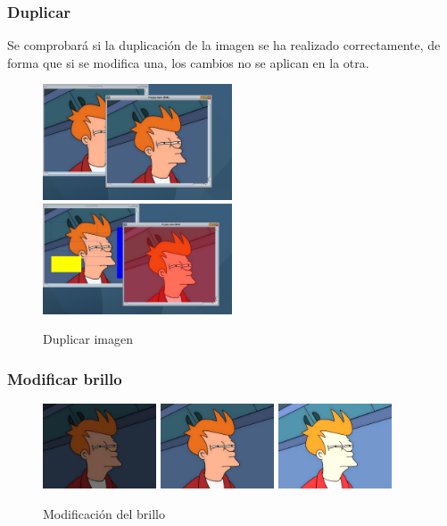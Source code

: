 \subsubsection{Duplicar}
Se comprobará si la duplicación de la imagen se ha realizado correctamente, de forma que si se modifica una, los cambios no se aplican en la otra.
\vskip0.3cm
\begin{figure}[H]
 \centering
  \includegraphics[width=0.5\textwidth]{imagenes/duplicar1.png}
  \includegraphics[width=0.5\textwidth]{imagenes/duplicar2.jpg}
 \caption{Duplicar imagen}
 \label{diseño}
 \end{figure}
\subsubsection{Modificar brillo}
\vskip0.3cm
\begin{figure}[H]
 \centering
  \includegraphics[width=0.3\textwidth]{imagenes/fryBrilo2.jpg}
  \includegraphics[width=0.3\textwidth]{imagenes/Fry.jpg}
  \includegraphics[width=0.3\textwidth]{imagenes/fryBrillo1.jpg}
 \caption{Modificación del brillo}
 \label{diseño}
\end{figure}
